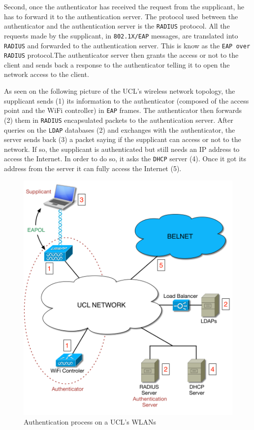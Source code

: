 Second, once the authenticator has received the request from the supplicant, he has to forward it to the authentication server. The protocol used between the authenticator and the authentication server is the \texttt{RADIUS} protocol. All the requests made by the supplicant, in \texttt{802.1X/EAP} messages, are translated into \texttt{RADIUS} and forwarded to the authentication server. This is know as the \texttt{EAP over RADIUS} protocol.The authenticator server then grants the access or not to the client and sends back a response to the authenticator telling it to open the network access to the client.

As seen on the following picture of the UCL's wireless network topology, the supplicant sends (1) its information to the authenticator (composed of the access point and the WiFi controller) in \texttt{EAP} frames. The authenticator then forwards (2) them in \texttt{RADIUS} encapsulated packets to the authentication server. After queries on the \texttt{LDAP} databases (2) and exchanges with the authenticator, the server sends back (3) a packet saying if the supplicant can access or not to the network. If so, the supplicant is authenticated but still needs an IP address to access the Internet. In order to do so, it asks the \texttt{DHCP} server (4). Once it got its address from the server it can fully access the Internet (5).


\begin{figure}[H]
	\center
	\includegraphics[width=.7\linewidth]{Pictures/chapter2/topology2.png}
	\caption{Authentication process on a UCL's WLANs}
\end{figure}


